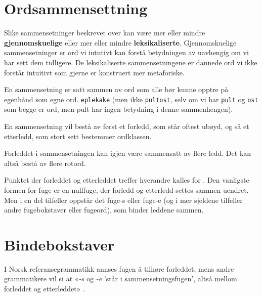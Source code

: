 \newline
{}\newline

\section{Ordsammensettning}

Slike sammensetninger beskrevet over kan være mer eller mindre \textbf{gjennomskuelige} eller mer eller mindre \textbf{leksikaliserte}. Gjennomskuelige sammensetninger er ord vi intutivt kan forstå betydningen av uavhengig om vi har sett dem tidligere. De leksikaliserte sammensetningene er dannede ord vi ikke forstår intuitivt som gjerne er konstruert mer metaforiske.

\newline
{}

En sammensetning er satt sammen av ord som alle bør kunne opptre på egenhånd som egne ord. \texttt{eplekake} (men ikke \texttt{pultost}, selv om vi har \texttt{pult} og \texttt{ost} som begge er ord, men pult har ingen betydning i denne sammenhengen).

En sammensetning vil bestå av først et forledd, som står oftest ubøyd, og så et etterledd, som stort sett bestemmer ordklassen.


Forleddet i sammensetningen kan igjen være sammensatt av flere ledd. Det kan altså bestå av flere rotord.


Punktet der forleddet og etterleddet treffer hverandre kalles for . Den vanligste formen for fuge er en nullfuge, der forledd og etterledd settes sammen uendret. Men i en del tilfeller oppstår det fuge-s eller fuge-e (og i mer sjeldene tilfeller andre fugebokstaver eller fugeord), som binder leddene sammen. 

\section{Bindebokstaver}
\label{sec:fuge-bokstav}

I Norsk referansegrammatikk \cite{faarlund1997norsk} annses fugen å tilhøre forleddet, mens andre grammatikere vil si at «\textit{-s} og \textit{-e} 'står i sammensetningsfugen', altså mellom forleddet og etterleddet» \cite{faarlund1997norsk}.

